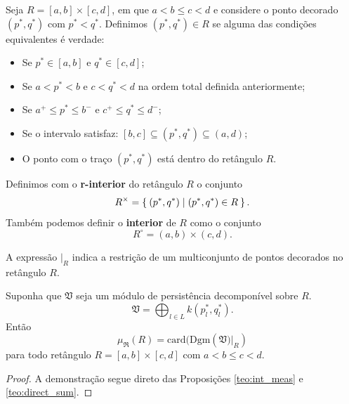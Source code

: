 \begin{defi}
    Seja $R=[a,b]\times [c,d]$, em que $a < b \leq c < d$ e considere o ponto decorado $(p^*, q^*)$ com $p^* < q^*$.
    Definimos $(p^*, q^*) \in R$ se alguma das condições equivalentes é verdade:
    \begin{itemize}
        \item Se $p^* \in [a,b]$ e $q^* \in [c,d]$;
        \item Se $a < p^* < b$ e $c < q^* < d$ na ordem total definida anteriormente;
        \item Se $a^+ \leq p^* \leq b^-$ e $c^+ \leq q^* \leq d^-$;
        \item Se o intervalo satisfaz: $[b,c] \subseteq (p^*, q^*) \subseteq (a,d)$;
        \item O ponto com o traço $(p^*, q^*)$ está dentro do retângulo $R$.
    \end{itemize} 
\end{defi}

\begin{defi}
    Definimos com o \textbf{r-interior} do retângulo $R$ o conjunto
    \begin{equation*}
        R^\times = \Set{(p^*, q^*) | (p^*, q^*) \in R}.
    \end{equation*} 
    Também podemos definir o \textbf{interior} de $R$ como o conjunto
    \begin{equation*}
        R^\circ = (a,b) \times (c,d).
    \end{equation*}
\end{defi}

A expressão $|_R$ indica a restrição de um multiconjunto de pontos decorados no retângulo $R$.

\begin{cor}
    Suponha que $\mathfrak{V}$ seja um módulo de persistência decomponível sobre $R$.
    \begin{equation*}
        \mathfrak{V} = \bigoplus_{l \in L} k(p^*_l, q^*_l).
    \end{equation*}
    Então 
    \begin{equation*}
        \mu_{\mathfrak{R}}(R) = \text{card}(\text{Dgm}(\mathfrak{V}\left.)\right|_R)
    \end{equation*}
    para todo retângulo $R = [a,b] \times [c,d]$ com $a < b \leq c < d$. 
\end{cor}
\begin{proof}
   A demonstração segue direto das Proposições \ref{teo:int_meas} e \ref{teo:direct_sum}. 
\end{proof}

